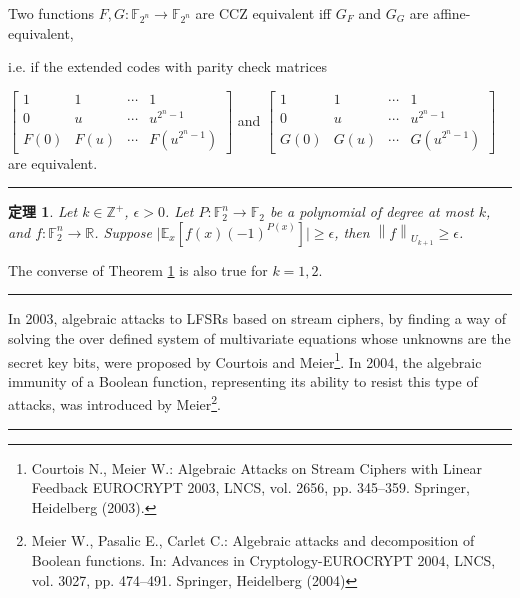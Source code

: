 \documentclass[12pt,a4paper]{ctexbook}
\newcommand{\0}{\textbf{0}}
\newcommand{\1}{\textbf{1}}
\newcommand{\Z}{\mathbb{Z}}
\newcommand{\F}{\mathbb{F}}
\newcommand{\R}{\mathbb{R}}
\newtheorem{theorem}{定理}
\begin{document}
    Two functions $ F,G:\F_{2^n}\rightarrow\F_{2^n} $ are CCZ equivalent iff
    $ G_F $ and $ G_G $ are affine-equivalent,

    i.e. if the extended codes with parity check matrices

    $ \begin{bmatrix}
        1 & 1 &\cdots &1\\
        0& u& \cdots &u^{2^n-1}\\
        F(0)& F(u)& \cdots &F(u^{2^n-1})
    \end{bmatrix} $ 
    and 
    $\begin{bmatrix}
        1 & 1 &\cdots &1\\
        0& u& \cdots &u^{2^n-1}\\
        G(0)& G(u)& \cdots &G(u^{2^n-1})
    \end{bmatrix}$
    are equivalent.


    \noindent\rule{\linewidth}{0.4pt}

    \begin{theorem}\label{gowers}
        Let $ k\in\Z^+ $, $ \epsilon>0 $. Let $ P:\F_2^n\rightarrow\F_2 $ be a polynomial of degree
        at most $ k $, and $ f:\F_2^n\rightarrow\R $. Suppose $ \lvert \mathbb{E}_x\left[f(x)(-1)^{P(x)}\right]\rvert\geq\epsilon  $, then $ \left\lVert f\right\rVert _{U_{k+1}}\geq\epsilon $.
    \end{theorem}
    The converse of Theorem \ref{gowers} is also true for $k = 1, 2$.



    
    \noindent\rule{\linewidth}{0.4pt}

    In 2003, algebraic attacks to LFSRs based on stream ciphers, by finding a way of solving 
    the over defined system of multivariate equations whose unknowns are the secret key bits,
    were proposed by Courtois and Meier\footnote{Courtois N., Meier W.: Algebraic Attacks on Stream Ciphers with Linear Feedback EUROCRYPT 2003,
    LNCS, vol. 2656, pp. 345–359. Springer, Heidelberg (2003).}. In 2004, the algebraic immunity of a Boolean
    function, representing its ability to resist this type of attacks, was introduced by Meier\footnote{Meier W., Pasalic E., Carlet C.: Algebraic attacks and decomposition of Boolean functions. In: Advances
    in Cryptology-EUROCRYPT 2004, LNCS, vol. 3027, pp. 474–491. Springer, Heidelberg (2004)}.

    \noindent\rule{\linewidth}{0.4pt}
\end{document}
